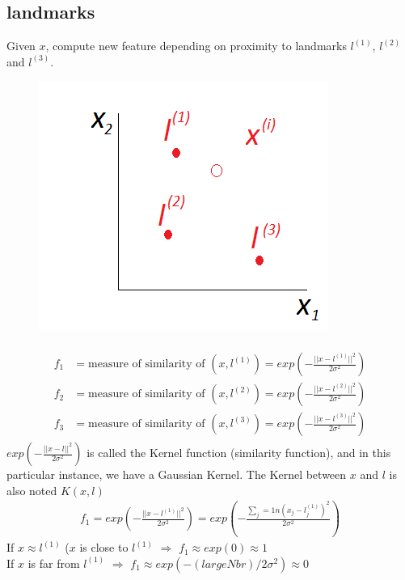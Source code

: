 \documentclass[a4paper,12pt]{report}
\begin{document}
\subsection{landmarks}
Given $x$, compute new feature depending on proximity to landmarks $l^{(1)}$, $l^{(2)}$ and $l^{(3)}$.
\begin{figure}[H]
	\centering
        \includegraphics[totalheight=4 cm]{landmarks.png}\caption{}
\end{figure}
\begin{align}
\begin{split}
f_1 &= \text{measure of similarity of \ } (x,l^{(1)}) = exp\left(-\frac{||x-l^{(1)}||^2}{2 \sigma^2} \right) \\
f_2 &= \text{measure of similarity of \ } (x,l^{(2)}) = exp\left(-\frac{||x-l^{(2)}||^2}{2 \sigma^2} \right) \\
f_3 &= \text{measure of similarity of\ } (x,l^{(3)}) = exp\left(-\frac{||x-l^{(3)}||^2}{2 \sigma^2} \right)
\end{split}
\end{align}
$exp\left(-\frac{||x-l||^2}{2 \sigma^2} \right)$ is called the Kernel function (similarity function), and in this particular instance, we have a Gaussian Kernel. The Kernel between $x$ and $l$ is also noted $K(x,l)$
\begin{align}
f_1 = exp\left(-\frac{||x-l^{(1)}||^2}{2 \sigma^2} \right) = exp\left(-\frac{\sum _j=1 n (x_j - l_j^{(1)})^2}{2 \sigma^2} \right) 
\end{align}
If $x \approx l^(1)$ ($x$ is close to $l^{(1)}$ $\Rightarrow$ $f_1 \approx exp(0) \approx 1$ \\
If $x$ is far from $l^{(1)}$ $\Rightarrow$ $f_1 \approx exp(-(large Nbr)/2 \sigma^2) \approx 0$
\end{document}
